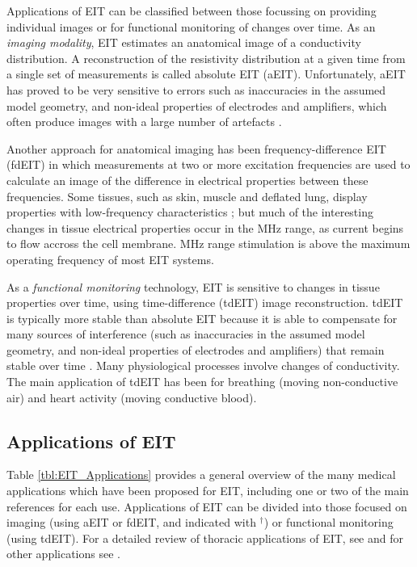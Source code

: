 \documentclass[12pt]{article} \usepackage[margin=3cm]{geometry} \usepackage[margin=20pt,font=small,labelfont=bf]{caption}\def\TBLWIDA{35mm}\def\TBLWIDB{95mm}
\begin{document}
Applications of EIT can be classified between those focussing on
providing individual images or for functional monitoring of changes over
time.
As an {\em imaging modality}, EIT estimates an anatomical
image of a conductivity distribution. A reconstruction
of the resistivity distribution at a given time from a single
set of measurements is called absolute EIT (aEIT). Unfortunately,
aEIT has proved to be very sensitive to errors
such as inaccuracies in the assumed
model geometry, and non-ideal properties of electrodes
and amplifiers, which
often produce images with a large number of artefacts
 \cite{Adler2015Hard, Nissinen2009Errors}.

Another approach for anatomical imaging has been frequency-difference
EIT (fdEIT) in which measurements at two or more excitation frequencies
are used to calculate an image of the difference
in electrical properties between these frequencies. Some tissues,
such as skin, muscle and deflated lung, display properties
with low-frequency characteristics
\cite{Gabriel2009Frequencies}; but much of 
the interesting changes in tissue electrical properties
occur in the MHz range, as current begins to flow accross the
cell membrane. MHz range stimulation is above the maximum operating frequency
of most EIT systems.

As a {\em functional monitoring} technology, EIT is sensitive
to changes in tissue properties over time, using
time-difference (tdEIT) image reconstruction.
tdEIT is typically more stable than absolute
EIT because it is able to compensate for many sources
of interference (such as inaccuracies in the assumed
model geometry, and non-ideal properties of electrodes
and amplifiers)
that remain stable over time \cite{Brown2003EIT,Adler2015Hard}.
Many physiological processes involve 
changes of conductivity.
The main application of tdEIT 
has been for breathing (moving non-conductive
air) and heart activity (moving conductive blood).

\subsection{Applications of EIT}


Table \ref{tbl:EIT_Applications}  provides a general overview of the many
medical applications which have been proposed for EIT, including one or two
of the main references for each use. 
Applications of EIT can be divided into those focused on
imaging (using aEIT or fdEIT, and indicated with $^\dagger$) or functional
monitoring (using tdEIT).
For a detailed review of thoracic applications of EIT, see \cite{Frerichs2017Chest} and
for other applications see \cite{Holder2004Book}.
\end{document}

